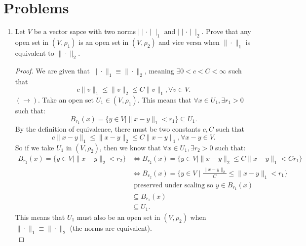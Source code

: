 \documentclass[a4paper]{article}
\begin{document}
\section{Problems}
  \begin{enumerate}
    \item Let $V$ be a vector sapce with two norms  $\mid \mid \cdot \mid \mid_{1}$ and $\mid \mid \cdot \mid \mid_{2}$. Prove that any open set in $\left( V, \rho_{1} \right) $ is an open set in $(V,\rho_{2})$ and vice versa when $\|\cdot\|_{1}$ is equivalent to $\|\cdot\|_{2}$.
      \begin{proof}
        We are given that $\|\cdot\|_{1} \equiv \| \cdot \|_{2}$, meaning $\exists 0 < c < C < \infty$ such that
        \[
          c \|v\|_{1} \leq \|v\|_{2} \leq C \|v\|_{1}, \forall v \in V 
        .\]
        $\left( \to \right) $. Take an open set $U_{1} \in (V,\rho_1)$. This means that $\forall x \in U_1, \exists r_1 > 0$ such that:
        \[
        B_{r_1}(x) = \{y \in V \mid \| x -y \|_{1} < r_1 \} \subseteq U_1 
        .\]
        By the definition of equivalence, there must be two constants $c,C$ such that
         \[
        c \| x-y\|_{1} \leq \|x-y\|_{2} \leq C \|x-y\|_{1}, \forall x-y \in V
        .\] 
        So if we take $U_1$ in $(V, \rho_2)$, then  we know that $\forall x \in U_1, \exists r_2 > 0$ such that:
        \begin{align*}
          B_{r_2}(x) = \{y \in V \mid \| x -y \|_{2} < r_2 \} &\iff B_{r_2}(x) = \{ y \in V \mid \|x-y\|_{2} \leq C \|x-y\|_{1} < C r_1\} \\
                                                          &\iff B_{r_2}(x) = \{y \in V \mid \frac{\|x-y\|_{2}}{C} \leq \|x-y\|_{1} < r_1  \} \\
                                                          &\text{ preserved under scaling so $y \in B_{r_1}(x)$}\\
                                                          &\subseteq B_{r_1}(x) \\
                                                          &\subseteq U_1
        .\end{align*}
        This means that $U_1$ must also be an open set in  $\left( V, \rho_2 \right) $ when $\|\cdot \|_{1} \equiv \|\cdot \|_{2}$ (the norms are equivalent).\\



\end{proof}
\end{enumerate}
\end{document}
